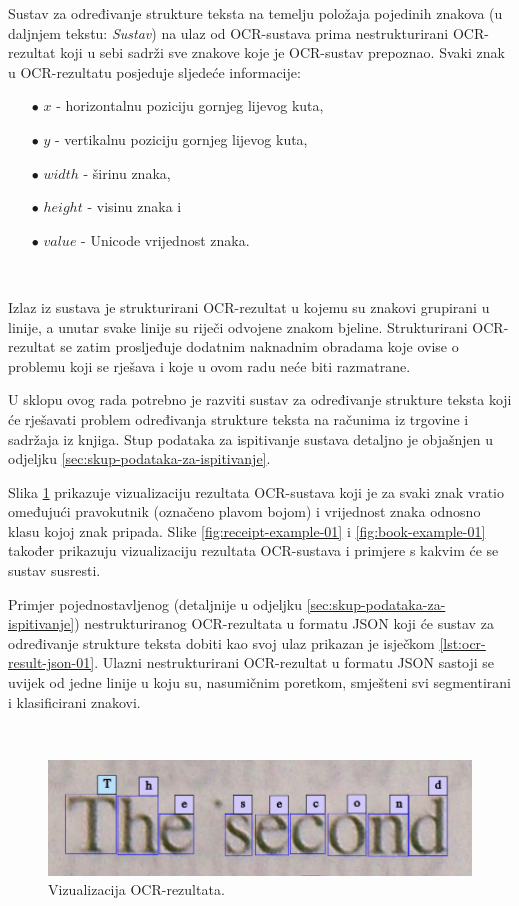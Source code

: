 \documentclass[times, utf8, zavrsni]{fer}
\begin{document}
Sustav za određivanje strukture teksta na temelju položaja pojedinih znakova
(u daljnjem tekstu: \emph{Sustav}) na ulaz od OCR-sustava prima
nestrukturirani OCR-rezultat koji u sebi sadrži sve znakove koje je OCR-sustav
prepoznao. Svaki znak u OCR-rezultatu posjeduje sljedeće informacije:
\begin{itemize}
    \item[$\bullet$] $x$ - horizontalnu poziciju gornjeg lijevog kuta,
    \item[$\bullet$] $y$ - vertikalnu poziciju gornjeg lijevog kuta,
    \item[$\bullet$] $width$ - širinu znaka,
    \item[$\bullet$] $height$ - visinu znaka i
    \item[$\bullet$] $value$ - Unicode vrijednost znaka.
\end{itemize}

\

Izlaz iz sustava je strukturirani OCR-rezultat u kojemu su znakovi
grupirani u linije, a unutar svake linije su riječi odvojene znakom
bjeline. Strukturirani OCR-rezultat se zatim prosljeđuje dodatnim naknadnim
obradama koje ovise o problemu koji se rješava i koje u ovom radu neće biti
razmatrane.

U sklopu ovog rada potrebno je razviti sustav za određivanje strukture
teksta koji će rješavati problem određivanja strukture teksta na računima iz
trgovine i sadržaja iz knjiga. Stup podataka za ispitivanje
sustava detaljno je objašnjen u odjeljku \ref{sec:skup-podataka-za-ispitivanje}.

Slika \ref{fig:book-example-02} prikazuje vizualizaciju rezultata OCR-sustava
koji je za svaki znak vratio omeđujući pravokutnik (označeno plavom bojom) i
vrijednost znaka odnosno klasu kojoj znak pripada.
Slike \ref{fig:receipt-example-01} i \ref{fig:book-example-01} također prikazuju
vizualizaciju rezultata OCR-sustava i primjere s kakvim će se sustav susresti.

Primjer pojednostavljenog (detaljnije u odjeljku
\ref{sec:skup-podataka-za-ispitivanje}) nestrukturiranog OCR-rezultata u formatu
JSON koji će sustav za određivanje strukture teksta dobiti kao svoj ulaz
prikazan je isječkom \ref{lst:ocr-result-json-01}. Ulazni nestrukturirani
OCR-rezultat u formatu JSON sastoji se uvijek od jedne linije u koju
su, nasumičnim poretkom, smješteni svi segmentirani i klasificirani znakovi.

\

\begin{figure}[htb]
    \centering
    \includegraphics[width=\textwidth]{images/book-example-02.png}
    \caption{Vizualizacija OCR-rezultata.}
    \label{fig:book-example-02}
\end{figure}
\end{document}
